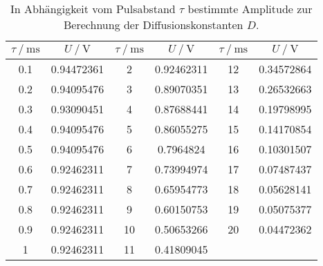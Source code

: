 \begin{table}
\centering
\caption{In Abhängigkeit vom Pulsabstand $\tau$ bestimmte Amplitude zur Berechnung der Diffusionskonstanten $D$.}
\begin{tabular}{S[table-format=3.0]  S[table-format=1.8] | S[table-format=2.0]  S[table-format=1.8]
  | S[table-format=2.0]  S[table-format=1.8]  }
\toprule
{} & 
&  & 
&  &   \\
 & 0.94472361 & 2  & 0.92462311 & 12 & 0.34572864 \\
0.2 & 0.94095476 & 3  & 0.89070351 & 13 & 0.26532663 \\
0.3 & 0.93090451 & 4  & 0.87688441 & 14 & 0.19798995 \\
0.4 & 0.94095476 & 5  & 0.86055275 & 15 & 0.14170854 \\
0.5 & 0.94095476 & 6  & 0.7964824  & 16 & 0.10301507 \\
0.6 & 0.92462311 & 7  & 0.73994974 & 17 & 0.07487437 \\
0.7 & 0.92462311 & 8  & 0.65954773 & 18 & 0.05628141 \\
0.8 & 0.92462311 & 9  & 0.60150753 & 19 & 0.05075377 \\
0.9 & 0.92462311 & 10 & 0.50653266 & 20 & 0.04472362 \\
1   & 0.92462311 & 11 & 0.41809045 \\
\bottomrule
\end{tabular}
\label{table:02}
\end{table}
